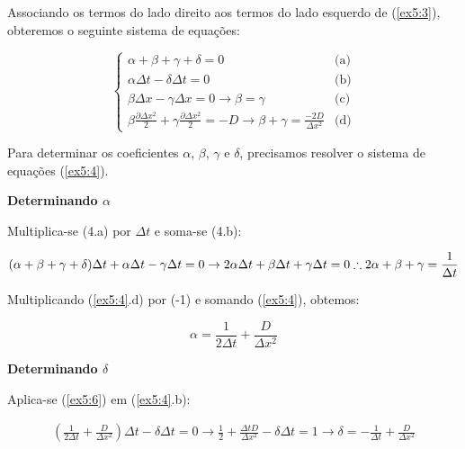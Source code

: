 \documentclass[11pt]{article}
\begin{document}
Associando os termos do lado direito aos termos do lado esquerdo de
(\ref{ex5:3}), obteremos o seguinte sistema de equações:

\begin{equation}
  \begin{cases}
    \alpha + \beta + \gamma + \delta = 0 & \text{(a)}\\
    \alpha \Delta{t} - \delta \Delta{t} = 0  & \text{(b)} \\
    \beta \Delta{x} - \gamma \Delta{x} = 0 \to \beta = \gamma & \text{(c)}\\
    \beta \frac{\partial{\Delta{x^2}}}{2} + \gamma \frac{\partial{\Delta{x^2}}}{2} = -D \to \beta + \gamma = \frac{-2D}{\Delta{x^2}} & \text{(d)}
  \end{cases}
  \label{ex5:4}
\end{equation}

Para determinar os coeficientes \(\alpha\), \(\beta\), \(\gamma\) e
\(\delta\), precisamos resolver o sistema de equações (\ref{ex5:4}).

\textbf{Determinando \(\alpha\)}

Multiplica-se (4.a) por \(\Delta{t}\) e soma-se (4.b):

\begin{equation}
    (\alpha + \beta + \gamma + \delta)\Delta{t} + \alpha \Delta{t} - \gamma \Delta{t} = 0 \to 2\alpha{\Delta{t}} + \beta{\Delta{t}} + \gamma{\Delta{t}} = 0 \\ 
    \therefore 2\alpha + \beta + \gamma = \frac{1}{\Delta{t}}
    \label{ex5:5}
\end{equation}

Multiplicando (\ref{ex5:4}.d) por (-1) e somando (\ref{ex5:4}), obtemos:

\begin{equation}
    \alpha = \frac{1}{2\Delta{t}} + \frac{D}{\Delta{x^2}}
    \label{ex5:6}
\end{equation}

\textbf{Determinando \(\delta\)}

Aplica-se (\ref{ex5:6}) em (\ref{ex5:4}.b):

\begin{equation}
    \begin{aligned}
        (\frac{1}{2\Delta{t}} + \frac{D}{\Delta{x^2}})\Delta{t} - \delta \Delta{t} = 0 \to  \frac{1}{2} + \frac{\Delta{t}D}{\Delta{x^2}} - \delta{\Delta{t}} = 1 \to \delta = -\frac{1}{\Delta{t}} + \frac{D}{\Delta{x^2}}
    \end{aligned}
    \label{ex5:7}
\end{equation}
\end{document}
